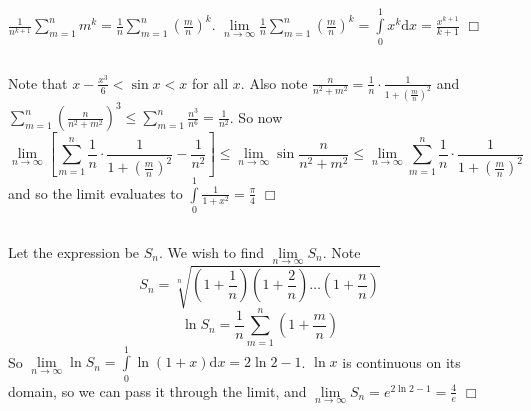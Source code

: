 \documentclass{article}
\begin{document}
\subsection{}
$\frac{1}{n^{k+1}}\sum\limits_{m=1}^n m^k = \frac{1}{n} \sum\limits_{m=1}^n {\left(\frac{m}{n}\right)}^k$. $\lim\limits_{n\rightarrow\infty} \frac{1}{n} \sum\limits_{m=1}^n {\left(\frac{m}{n}\right)}^k = \int\limits_0^1 x^k \mathrm{d}x = \frac{x^{k+1}}{k+1}$ $\Box$

\subsection{}
Note that $x - \frac{x^3}{6} < \sin x < x$ for all $x$. Also note $\frac{n}{n^2+m^2} = \frac{1}{n} \cdot \frac{1}{1+{\left(\frac{m}{n}\right)}^2}$ and $\sum\limits_{m=1}^n {\left(\frac{n}{n^2+m^2}\right)}^3 \leq \sum\limits_{m=1}^n \frac{n^3}{n^6} = \frac{1}{n^2}$. So now
$$\lim\limits_{n\rightarrow\infty} [\sum\limits_{m=1}^n \frac{1}{n} \cdot \frac{1}{1+{\left(\frac{m}{n}\right)}^2} - \frac{1}{n^2}] \leq \lim\limits_{n\rightarrow\infty} \sin \frac{n}{n^2+m^2} \leq \lim\limits_{n\rightarrow\infty} \sum\limits_{m=1}^n \frac{1}{n} \cdot \frac{1}{1+{\left(\frac{m}{n}\right)}^2}$$
and so the limit evaluates to $\int\limits_0^1 \frac{1}{1+x^2} = \frac{\pi}{4}$ $\Box$

\subsection{}
Let the expression be $S_n$. We wish to find $\lim\limits_{n\rightarrow\infty} S_n$. Note
$$S_n = \sqrt[n]{(1 + \frac{1}{n})(1+\frac{2}{n})\dots(1 + \frac{n}{n})}$$
$$\ln S_n = \frac{1}{n} \sum\limits_{m=1}^n \left(1 + \frac{m}{n}\right)$$
So $\lim\limits_{n\rightarrow\infty} \ln S_n = \int\limits_0^1 \ln (1+x) \mathrm{d}x = 2\ln 2 - 1$. $\ln x$ is continuous on its domain, so we can pass it through the limit, and $\lim\limits_{n\rightarrow\infty} S_n = e ^ {2\ln 2 - 1} = \frac{4}{e}$ $\Box$
\end{document}
